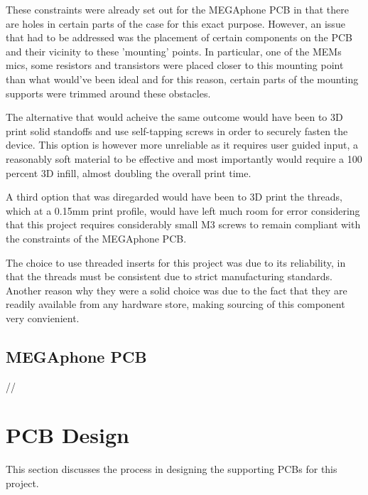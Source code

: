 These constraints were already set out for the MEGAphone PCB in that there are holes in certain parts of the case for this exact purpose.
However, an issue that had to be addressed was the placement of certain components on the PCB and their vicinity to these 'mounting' points.
In particular, one of the MEMs mics, some resistors and transistors were placed closer to this mounting point than what would've been ideal and for this reason, certain parts of the mounting supports were trimmed around these obstacles.

The alternative that would acheive the same outcome would have been to 3D print solid standoffs and use self-tapping screws in order to securely fasten the device.
This option is however more unreliable as it requires user guided input, a reasonably soft material to be effective and most importantly would require a 100 percent 3D infill, almost doubling the overall print time.

A third option that was diregarded would have been to 3D print the threads, which at a 0.15mm print profile, would have left much room for error considering that this project requires considerably small M3 screws to remain compliant with the constraints of the MEGAphone PCB.

The choice to use threaded inserts for this project was due to its reliability, in that the threads must be consistent due to strict manufacturing standards.
Another reason why they were a solid choice was due to the fact that they are readily available from any hardware store, making sourcing of this component very convienient.

\subsection{MEGAphone PCB}
//


\section{PCB Design}
This section discusses the process in designing the supporting PCBs for this project.

